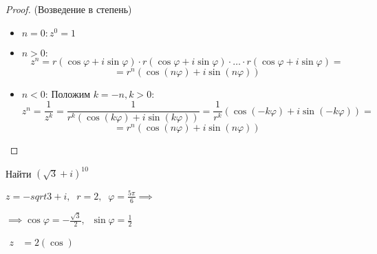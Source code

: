 \DeclareRobustCommand{\divby}{%
  \mathrel{\vbox{\baselineskip.65ex\lineskiplimit0pt\hbox{.}\hbox{.}\hbox{.}}}%
}



\begin{proof} (Возведение в степень)
    \begin{itemize}
        \item $n = 0: z^0 = 1$
        \item $n > 0: $
        $$z^n = r(\cos \varphi + i \sin \varphi) \cdot r(\cos \varphi + i \sin \varphi) \cdot \ldots \cdot r(\cos \varphi + i \sin \varphi) =$$
        $$=r^n(\cos (n\varphi) + i \sin (n\varphi))$$
        \item $n < 0$: Положим $k = -n, k > 0$:
        $$z^n = \frac{1}{z^k} = \frac{1}{r^k(\cos (k\varphi) + i \sin (k\varphi))} = \frac{1}{r^k}(\cos (-k\varphi) + i \sin (-k\varphi)) = $$
        $$= r^n(\cos (n\varphi) + i \sin (n\varphi))$$
    \end{itemize}
\end{proof}

\begin{eg} Найти $(\sqrt{3} + i)^{10}$
    
    $z = -sqrt{3} + i, \;\; r = 2, \;\; \varphi = \frac{5\pi}{6} \implies$

    $\implies \cos \varphi = -\frac{\sqrt{3}}{2}, \;\; \sin \varphi = \frac{1}{2}$

    $\begin{aligned}
        z &= 2(\cos )
    \end{aligned}$
\end{eg}